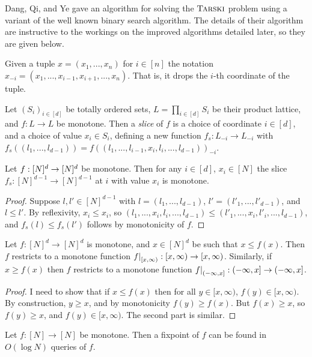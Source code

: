 Dang, Qi, and Ye gave an algorithm for solving the $\textsc{Tarski}$ problem\citep{dangQiYe} using a variant of the well
known binary search algorithm. The details of their algorithm are instructive
to the workings on the improved algorithms detailed  later, so they are given below.
\begin{notation}
  Given a tuple $x = (x_1, ..., x_n)$ for $i \in [n]$ the notation $x_{-i} = (x_1, ..., x_{i-1}, x_{i+1}, ..., x_n)$. That is, it drops
  the $i$-th coordinate of the tuple.
\end{notation}
\begin{definition}[Slice]
  Let $(S_i)_{i \in [d]}$ be totally ordered sets, $L = \prod_{i \in [d]} S_i$
  be their product lattice, and $f : L \to L$ be monotone. 
  Then a \emph{slice} of $f$ is a choice of coordinate $i \in [d]$,
  and a choice of value $x_i \in S_i$, defining a new function 
  $f_s : L_{-i} \to L_{-i}$ with
  $f_s((l_1, ..., l_{d-1})) = f((l_1, ..., l_{i-1},  x_i, l_i, ..., l_{d-1}))_{-i}$.
\end{definition}
\begin{lemma} \label{sliceMonotone}
  Let $f : [N]^d \to [N]^d$ be monotone. Then for any $i \in [d]$, $x_i \in [N]$ the slice $f_s : [N]^{d-1} \to [N]^{d-1}$ at $i$ with value $x_i$  
  is monotone. 
\end{lemma}
\begin{proof}
  Suppose $l, l' \in [N]^{d-1}$ with $l = (l_1, ..., l_{d-1})$, $l' = (l'_1, ..., l'_{d-1})$, and $l \leq l'$.
  By reflexivity, $x_i \leq x_i$, so $(l_1, ... , x_i, l_i, ..., l_{d-1}) \leq (l'_1, ... , x_i, l'_i, ..., l_{d-1})$,
  and $f_s(l) \leq f_s(l')$ follows by monotonicity of $f$.
\end{proof}
\begin{lemma}\label{restricts}
  Let $f : [N]^d \to [N]^d$ is monotone, and $x \in [N]^d$ be such that $x \leq f(x)$. Then
  $f$ restricts to a monotone function $\restr{f}{[x, \infty)} : [x, \infty) \to [x, \infty)$. Similarly,
  if $x \geq f(x)$ then $f$ restricts to a monotone function $\restr{f}{(-\infty, x]} : (-\infty, x] \to (-\infty, x]$.
\end{lemma}
\begin{proof}
  I need to show that if $x \leq f(x)$ then for all $y \in [x, \infty)$, $f(y) \in [x, \infty)$. By construction,
  $y \geq x$, and by monotonicity $f(y) \geq f(x)$. But $f(x) \geq x$, so $f(y) \geq x$, and $f(y) \in [x, \infty)$. The second part
  is similar.
\end{proof}
\begin{lemma}\label{d1Case}
  Let $f : [N] \to [N]$ be monotone. Then a fixpoint of $f$ can be found in $O(\log N)$ queries of $f$.
\end{lemma}
